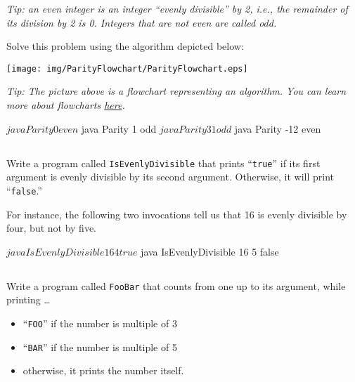 \documentclass[a4paper, 12pt]{article}
\begin{document}
\textsl{Tip: an \emph{even} integer is an integer ``evenly divisible'' by 2,
i.e., the remainder of its division by 2 is 0. Integers that are not even are
called \emph{odd}.}

Solve this problem using the algorithm depicted below:

\begin{center}
  \texttt{[image: img/ParityFlowchart/ParityFlowchart.eps]}
\end{center}
\vspace{0.5cm}

\textsl{Tip: The picture above is a flowchart representing an algorithm. You
can learn more about flowcharts
\href{http://en.wikipedia.org/wiki/Flowchart}{here}.}

\begin{cmd}
$ java Parity 0
even
$ java Parity 1
odd
$ java Parity 31
odd
$ java Parity -12
even
\end{cmd}


\subsection{}

Write a program called \texttt{IsEvenlyDivisible} that prints ``\texttt{true}''
if its first argument is evenly divisible by its second argument. Otherwise, it
will print ``\texttt{false}.''

For instance, the following two invocations tell us that 16 is evenly divisible
by four, but not by five.

\begin{cmd}
$ java IsEvenlyDivisible 16 4
true
$ java IsEvenlyDivisible 16 5
false
\end{cmd}


\subsection{}

Write a program called \texttt{FooBar} that counts from one up to its argument,
while printing \ldots

\begin{itemize}
  \item ``\texttt{FOO}'' if the number is multiple of 3
  \item ``\texttt{BAR}'' if the number is multiple of 5
  \item otherwise, it prints the number itself.
\end{itemize}
\end{document}
